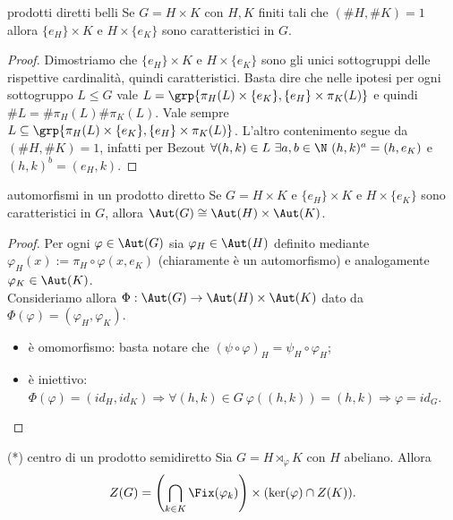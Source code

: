 \begin{proposition}{prodotti diretti belli}
    Se $G = H \times K$ con $H,K$ finiti tali che $(\#H, \#K) = 1$ allora $\{e_H\} \times K$ e $H \times \{e_K\}$ sono caratteristici in $G$.
\end{proposition}
\begin{proof}
    Dimostriamo che $\{e_H\} \times K$ e $H \times \{e_K\}$ sono gli unici sottogruppi delle rispettive cardinalità, quindi caratteristici. Basta dire che nelle ipotesi per ogni sottogruppo $L \le G$ vale $L = \grp{\pi_H(L) \times \{e_K\}, \{e_H\} \times \pi_K(L)}$ e quindi $\#L = \#\pi_H(L) \#\pi_K(L)$. Vale sempre $L \subseteq \grp{\pi_H(L) \times \{e_K\}, \{e_H\} \times \pi_K(L)}$. L'altro contenimento segue da $(\#H, \#K) = 1$, infatti per Bezout $\forall (h, k) \in L \ \exists a, b \in \N \ (h, k)^a = (h, e_K)$ e $(h, k)^b = (e_H, k)$.
\end{proof}
\begin{proposition}{automorfismi in un prodotto diretto}
    Se $G = H \times K$ e $\{e_H\} \times K$ e $H \times \{e_K\}$ sono caratteristici in $G$, allora $\Aut(G) \cong \Aut(H) \times \Aut(K)$. 
\end{proposition}
\begin{proof}
    Per ogni $\varphi \in \Aut(G)$ sia $\varphi_H \in \Aut(H)$ definito mediante $\varphi_H(x) := \pi_H \circ \varphi (x, e_K)$ (chiaramente è un automorfismo) e analogamente $\varphi_K \in \Aut(K)$. \\
    Consideriamo allora $\Phi: \Aut(G) \rightarrow \Aut(H) \times \Aut(K)$ dato da $\Phi(\varphi) = (\varphi_H, \varphi_K)$. 
\begin{itemize}
    \item è omomorfismo: basta notare che $(\psi \circ \varphi)_H = \psi_H \circ \varphi_H$;
    \item è iniettivo: $\Phi(\varphi)=(id_H,id_K) \Rightarrow \forall (h, k) \in G \ \varphi((h, k)) = (h, k) \Rightarrow \varphi = id_G$.
\end{itemize}
\end{proof} 
\begin{proposition}{(*) centro di un prodotto semidiretto}
    Sia $G= H \rtimes_{\varphi} K$ con $H$ abeliano. Allora
    \[
    Z(G) = \left( \bigcap_{k \in K} \Fix(\varphi_k) \right) \times (\ker(\varphi) \cap Z(K)).
    \]
\end{proposition}
